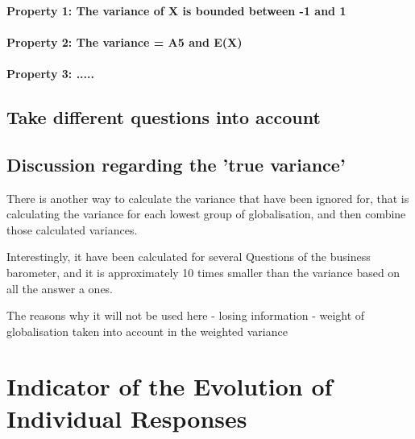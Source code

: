 \documentclass[12pt,a4paper,oneside]{book}
\begin{document}




\subsubsection{Property 1: The variance of X is bounded between -1 and 1}

\subsubsection{Property 2: The variance = A5 and E(X)}


\subsubsection{Property 3: .....}


\section{Take different questions into account}





\section{Discussion regarding the 'true variance'}

There is another way to calculate the variance that have been ignored for, that is calculating the variance for each lowest group of globalisation, and then combine those calculated variances.


Interestingly, it have been calculated for several Questions of the business barometer, and it is approximately 10 times smaller than the variance based on all the answer a ones.



The reasons why it will not be used here
- losing information
- weight of globalisation taken into account in the weighted variance




\chapter{Indicator of the Evolution of Individual Responses}
\end{document}
